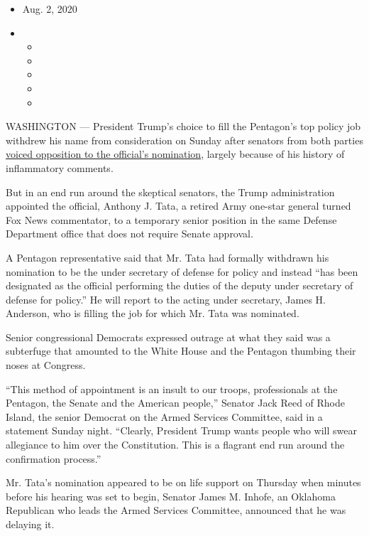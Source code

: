 \begin{itemize}
\item
  Aug. 2, 2020
\item
  \begin{itemize}
  \item
  \item
  \item
  \item
  \item
  \end{itemize}
\end{itemize}

WASHINGTON --- President Trump's choice to fill the Pentagon's top
policy job withdrew his name from consideration on Sunday after senators
from both parties
\href{https://www.nytimes.com/2020/07/30/us/politics/trump-inhofe-tata-pentagon.html}{voiced
opposition to the official's nomination}, largely because of his history
of inflammatory comments.

But in an end run around the skeptical senators, the Trump
administration appointed the official, Anthony J. Tata, a retired Army
one-star general turned Fox News commentator, to a temporary senior
position in the same Defense Department office that does not require
Senate approval.

A Pentagon representative said that Mr. Tata had formally withdrawn his
nomination to be the under secretary of defense for policy and instead
``has been designated as the official performing the duties of the
deputy under secretary of defense for policy.'' He will report to the
acting under secretary, James H. Anderson, who is filling the job for
which Mr. Tata was nominated.

Senior congressional Democrats expressed outrage at what they said was a
subterfuge that amounted to the White House and the Pentagon thumbing
their noses at Congress.

``This method of appointment is an insult to our troops, professionals
at the Pentagon, the Senate and the American people,'' Senator Jack Reed
of Rhode Island, the senior Democrat on the Armed Services Committee,
said in a statement Sunday night. ``Clearly, President Trump wants
people who will swear allegiance to him over the Constitution. This is a
flagrant end run around the confirmation process.''

Mr. Tata's nomination appeared to be on life support on Thursday when
minutes before his hearing was set to begin, Senator James M. Inhofe, an
Oklahoma Republican who leads the Armed Services Committee, announced
that he was delaying it.

